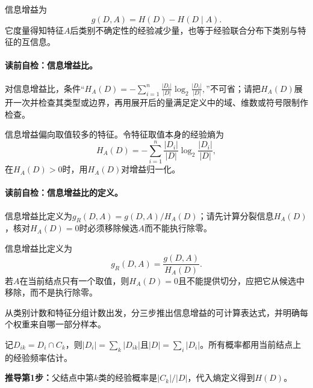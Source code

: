 信息增益为
\[
g(D,A)=H(D)-H(D\mid A).
\]
它度量得知特征$A$后类别不确定性的经验减少量，也等于经验联合分布下类别与特征的互信息。

\paragraph{读前自检：信息增益比。}对信息增益比，条件“$H_A(D)=-\sum_{i=1}^{n}\frac{|D_i|}{|D|}\log_2\frac{|D_i|}{|D|},$”不可省；请把$H_A(D)$展开一次并检查其类型或边界，再用展开后的量满足定义中的域、维数或符号限制作检查。\par

信息增益偏向取值较多的特征。令特征取值本身的经验熵为
\[
H_A(D)=-\sum_{i=1}^{n}\frac{|D_i|}{|D|}\log_2\frac{|D_i|}{|D|},
\]
在$H_A(D)>0$时，用$H_A(D)$对增益归一化。

\paragraph{读前自检：信息增益比的定义。}信息增益比定义为$g_R(D,A)=g(D,A)/H_A(D)$；请先计算分裂信息$H_A(D)$，核对$H_A(D)=0$时必须移除候选$A$而不能执行除零。\par

信息增益比定义为
\[
g_R(D,A)=\frac{g(D,A)}{H_A(D)}.
\]
若$A$在当前结点只有一个取值，则$H_A(D)=0$且不能提供切分，应把它从候选中移除，而不是执行除零。

\label{struct:V2-C04-CH11}

\begin{derivationgoalbox}
从类别计数和特征分组计数出发，分三步推出信息增益的可计算表达式，并明确每个权重来自哪一部分样本。
\end{derivationgoalbox}
\begin{derivationprepbox}
记$D_{ik}=D_i\cap C_k$，则$|D_i|=\sum_k|D_{ik}|$且$|D|=\sum_i|D_i|$。所有概率都用当前结点上的经验频率估计。
\end{derivationprepbox}
\textbf{推导第1步：}父结点中第$k$类的经验概率是$|C_k|/|D|$，代入熵定义得到$H(D)$。

